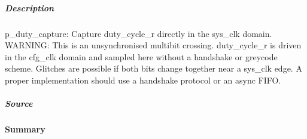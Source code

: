 \documentclass[letterpaper,10pt,english]{sphinxmanual}
\begin{document}
\subparagraph{Description}
\label{\detokenize{modules/cfg_sync/processes/p_duty_capture:description}}
\sphinxAtStartPar
p\_duty\_capture: Capture duty\_cycle\_r directly in the sys\_clk domain.
WARNING: This is an unsynchronised multi\sphinxhyphen{}bit crossing. duty\_cycle\_r is
driven in the cfg\_clk domain and sampled here without a handshake or
grey\sphinxhyphen{}code scheme. Glitches are possible if both bits change together
near a sys\_clk edge. A proper implementation should use a handshake
protocol or an async FIFO.


\subparagraph{Source}
\label{\detokenize{modules/cfg_sync/processes/p_duty_capture:source}}
\begin{sphinxVerbatim}[commandchars=\\\{\}]
\end{sphinxVerbatim}


\paragraph{Summary}
\label{\detokenize{modules/cfg_sync/processes/index:summary}}
\end{document}
